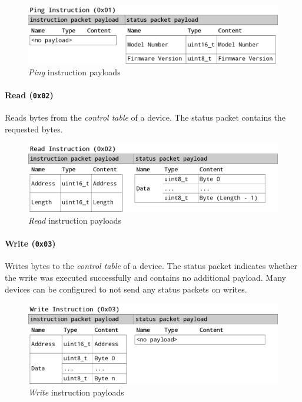 \begin{figure}[H]
    \centering
    \includegraphics[scale=0.2]{img/ping_packet.png}
    \caption{\textit{Ping} instruction payloads}
\end{figure}

\paragraph{Read (\lstinline{0x02})}

Reads bytes from the \textit{control table} of a device. The status packet contains the requested
bytes.

\begin{figure}[H]
    \centering
    \includegraphics[scale=0.2]{img/read_packet.png}
    \caption{\textit{Read} instruction payloads}
\end{figure}

\paragraph{Write (\lstinline{0x03})}

Writes bytes to the \textit{control table} of a device. The status packet indicates whether the write
was executed successfully and contains no additional payload. Many devices can be configured to not
send any status packets on writes.

\begin{figure}[H]
    \centering
    \includegraphics[scale=0.2]{img/write_packet.png}
    \caption{\textit{Write} instruction payloads}
\end{figure}

